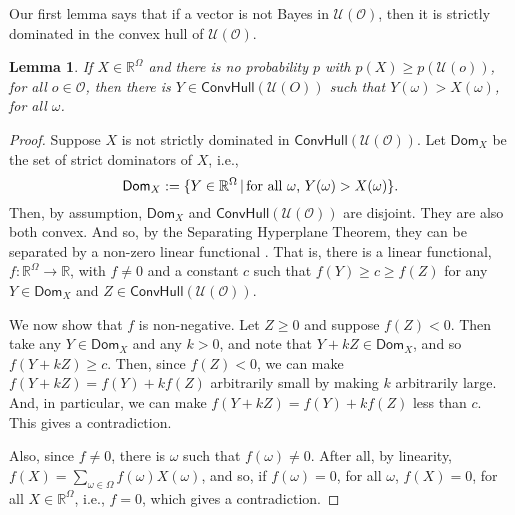 \documentclass[a4paper]{article}
\newtheorem{lemma}[theorem]{Lemma}
\renewcommand\O{\mathcal{O}}
\newcommand\Uwald{\mathcal{U}} %
\newcommand{\Dom}{\mathsf{Dom}}
\renewcommand{\Re}{\mathbb{R}}
\newcommand{\Conv}{\mathsf{ConvHull}}
\newcommand\SetDelimiter[1][]{
	\nonscript\,#1\vert \allowbreak \nonscript\,\mathopen{}}
\providecommand\given{\SetDelimiter}
\renewcommand{\geq}{\geqslant}
\newenvironment{CCM rewritten}
{\begingroup\color{blue}} %
{\endgroup}              %
\begin{document}
	Our first lemma says that if a vector is not Bayes in $\Uwald(\O)$, then it is strictly dominated in the convex hull of $\Uwald(\O)$.
	\begin{lemma}\label{thm:cct:admiss in conv are Bayes in conv}
		If $X\in\Re^\Omega$ and  there is no probability $p$ with $p(X)\geq p(\Uwald(o))$, for all $o\in\O$, then there is $Y\in\Conv(\Uwald(O))$ such that $Y(\omega)>X(\omega)$, for all $\omega$.
	\end{lemma}
	\begin{proof}
		Suppose $X$ is not strictly dominated in $\Conv(\Uwald(\O))$. 
		Let $\Dom_X$ be the set of strict dominators of $X$, i.e., $$\Dom_X :=\{Y\in \Re^\Omega\given \text{for all $\omega$, }Y(\omega)>X(\omega)\}.$$ Then, by assumption, $\Dom_X $ and $\Conv(\Uwald(\O))$ are disjoint. They are also both convex. And so, by the Separating Hyperplane Theorem, they can be separated by a non-zero linear functional \citep[Section 2.5.1]{boyd2004co}. That is, there is a linear functional, $f:\Re^\Omega\to\Re$, with $f\neq 0$ and a constant $c$ such that $f(Y)\geq c \geq f(Z)$ for any $Y\in \Dom_X $ and $Z\in \Conv(\Uwald(\O))$.

		
		We now show that $f$ is non-negative. Let $Z\geq 0$ and suppose $f(Z)<0$. Then take any $Y\in \Dom_X $ and any $k > 0$, and note that $Y+kZ \in \Dom_X$, and so $f(Y + kZ) \geq c$. Then, since $f(Z) < 0$, we can make $f(Y+kZ)=f(Y)+kf(Z)$ arbitrarily small by making $k$ arbitrarily large. And, in particular, we can make $f(Y+kZ)=f(Y)+kf(Z)$ less than $c$. This gives a contradiction. 
		
		Also, since $f \neq 0$, there is $\omega$ such that $f(\omega)\neq 0$. After all, by linearity, $f(X) = \sum_{\omega\in\Omega}f(\omega)X(\omega)$, and so, if $f(\omega) = 0$, for all $\omega$, $f(X) = 0$, for all $X \in \Re^\Omega$, i.e., $f = 0$, which gives a contradiction. %
		

\end{proof}
\end{document}
